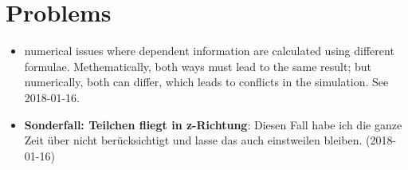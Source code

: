 \section{Problems}\label{problems}

\begin{itemize}
\tightlist
\item
  numerical issues where dependent information are calculated using
  different formulae. Methematically, both ways must lead to the same
  result; but numerically, both can differ, which leads to conflicts in
  the simulation. See 2018-01-16.
\item
  \textbf{Sonderfall: Teilchen fliegt in z-Richtung}: Diesen Fall habe
  ich die ganze Zeit über nicht berücksichtigt und lasse das auch
  einstweilen bleiben. (2018-01-16)
\end{itemize}
